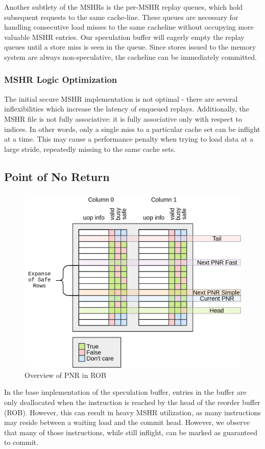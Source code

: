 Another subtlety of the MSHRs is the per-MSHR replay queues, which hold subsequent requests to the same cache-line. These queues are necessary for handling consecutive load misses to the same cacheline without occupying more valuable MSHR entries. Our speculation buffer will eagerly empty the replay queues until a store miss is seen in the queue. Since stores issued to the memory system are always non-speculative, the cacheline can be immediately committed.

\subsubsection{MSHR Logic Optimization}
The initial secure MSHR implementation is not optimal - there are several inflexibilities which increase the latency of enqueued replays. Additionally, the MSHR file is not fully associative: it is fully associative only with respect to indices. In other words, only a single miss to a particular cache set can be inflight at a time. This may cause a performance penalty when trying to load data at a large stride, repeatedly missing to the same cache sets.

\subsection{Point of No Return}
\begin{figure}
  \begin{center}\includegraphics[scale=0.17]{rob_pnr.png}\end{center}
  \caption{Overview of PNR in ROB}
\end{figure}
In the base implementation of the speculation buffer, entries in the buffer are only deallocated when the instruction is reached by the head of the reorder buffer (ROB). However, this can result in heavy MSHR utilization, as many instructions may reside between a waiting load and the commit head. However, we observe that many of those instructions, while still inflight, can be marked as guaranteed to commit.

